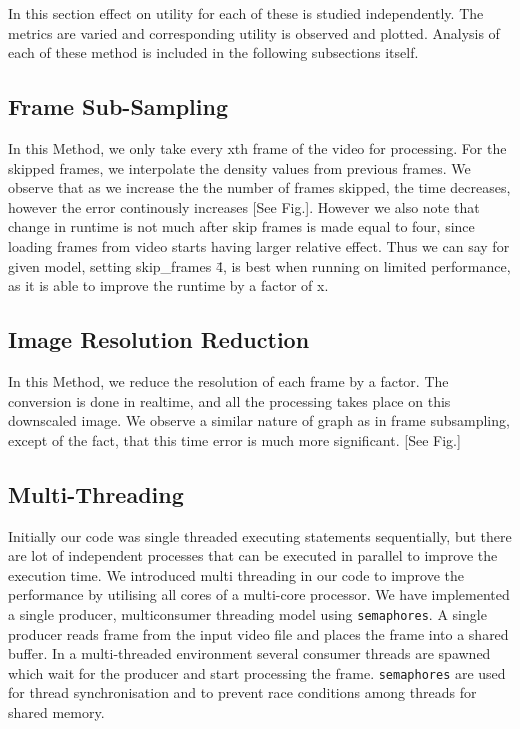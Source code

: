 \documentclass[conference]{IEEEtran}
\begin{document}
In this section effect on utility for each of these is studied independently. The metrics are varied and corresponding 
utility is observed and plotted. Analysis of each of these method is included in the following subsections itself.

\subsection{Frame Sub-Sampling}

In this Method, we only take every xth frame of the video for processing. For the skipped frames, we interpolate 
the density values from previous frames. We observe that as we increase the the number of frames skipped, the time decreases, however the error continously increases [See Fig.].
However we also note that change in runtime is not much after skip frames is made equal to four, since loading frames from video starts having larger relative effect.
Thus we can say for given model, setting skip\_frames \= 4, is best 
when running on limited performance, as it is able to improve the runtime by a factor of x.

\subsection{Image Resolution Reduction}

In this Method, we reduce the resolution of each frame by a factor. The conversion is done in realtime, and all the processing takes place on this downscaled image.
We observe a similar nature of graph as in frame subsampling, except of the fact, that this time error is much more significant. [See Fig.]

\subsection{Multi-Threading}
Initially our code was single threaded executing statements sequentially, but there are lot of independent processes that can be executed in parallel to improve the execution time.
We introduced multi threading in our code to improve the performance by utilising all cores of a multi-core processor. We have implemented a single producer, multiconsumer threading model using \verb|semaphores|.
A single producer reads frame from the input video file and places the frame into a shared buffer. In a multi-threaded environment several consumer threads are spawned which wait for the
producer and start processing the frame. \verb|semaphores| are used for thread synchronisation and to prevent race conditions among threads for shared memory.
\end{document}
